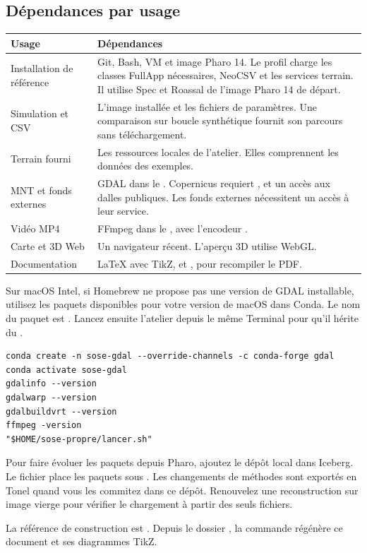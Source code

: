 \subsection{Dépendances par usage}
\begin{tabularx}{\linewidth}{@{}lY@{}}
\toprule
Usage & Dépendances \\
\midrule
Installation de référence & Git, Bash, VM et image Pharo 14. Le profil charge les classes FullApp nécessaires, NeoCSV et les services terrain. Il utilise Spec et Roassal de l'image Pharo 14 de départ. \\
Simulation et CSV & L'image installée et les fichiers de paramètres. Une comparaison sur boucle synthétique fournit son parcours sans téléchargement. \\
Terrain fourni & Les ressources locales de l'atelier. Elles comprennent les données des exemples. \\
MNT et fonds externes & GDAL dans le . Copernicus requiert ,  et un accès aux dalles publiques. Les fonds externes nécessitent un accès à leur service. \\
Vidéo MP4 & FFmpeg dans le , avec l'encodeur . \\
Carte et 3D Web & Un navigateur récent. L'aperçu 3D utilise WebGL. \\
Documentation & LaTeX avec TikZ,  et , pour recompiler le PDF. \\
\bottomrule
\end{tabularx}

Sur macOS Intel, si Homebrew ne propose pas une version de GDAL installable, utilisez les paquets  disponibles pour votre version de macOS dans Conda. Le nom du paquet est . Lancez ensuite l'atelier depuis le même Terminal pour qu'il hérite du .

\begin{lstlisting}
conda create -n sose-gdal --override-channels -c conda-forge gdal
conda activate sose-gdal
gdalinfo --version
gdalwarp --version
gdalbuildvrt --version
ffmpeg -version
"$HOME/sose-propre/lancer.sh"
\end{lstlisting}

Pour faire évoluer les paquets depuis Pharo, ajoutez le dépôt local dans Iceberg. Le fichier  place les paquets sous . Les changements de méthodes sont exportés en Tonel quand vous les commitez dans ce dépôt. Renouvelez une reconstruction sur image vierge pour vérifier le chargement à partir des seuls fichiers.

La référence de construction est . Depuis le dossier , la commande  régénère ce document et ses diagrammes TikZ.
